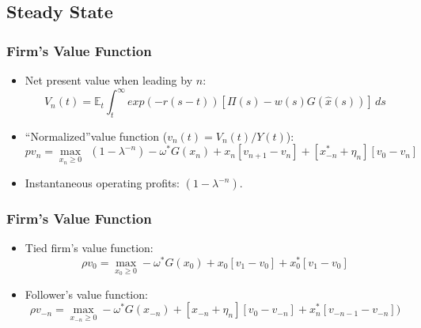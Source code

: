 \documentclass{beamer}
\begin{document}
\subsection{Steady State}
\label{sub:steady_state}
\begin{frame}[t]\frametitle{Firm's Value Function} 
  \begin{itemize}
    \vspace{2mm}
    \item<+-> Net present value when leading by $n$:
      \begin{equation*}
        V_n(t) = \mathbb{E}_t \int_{t}^{\infty} exp(-r(s - t))[\Pi(s) - w(s)G(\hat{x}(s))]\,ds 
      \end{equation*}
	\vspace{2mm}
    \item<+-> ``Normalized''value function ($v_n(t) = V_n(t) / Y(t)$):
      \begin{equation*} \label{eq:rvf_leader}  %
          pv_n = \max_{x_n \geq 0}\ \ (1 - \lambda^{-n}) - \omega^*G(x_n) + x_n[v_{n+1} - v_n] + [x_{-n}^* + \eta_n][v_0 - v_n]
        \end{equation*}
   \item<+-> Instantaneous operating profits: $(1 - \lambda^{-n})$.
  \end{itemize}
\end{frame}

\begin{frame}[t]\frametitle{Firm's Value Function} 
  \begin{itemize}
	  \vspace{10mm}
    \item<+-> Tied firm's value function:
      \begin{equation*} \label{eq:rvf_tied}
        \rho v_0 = \max_{x_0 \geq 0} -\omega^*G(x_{0}) + x_{0}[v_1 - v_0] + x_0^*[v_{1} - v_0]
      \end{equation*}

    \item<+-> Follower's value function:
      \begin{equation*} \label{eq:rvf_follower}
        \rho v_{-n} = \max_{x_{-n} \geq 0} -\omega^*G(x_{-n}) + [x_{-n} + \eta_n][v_0 - v_{-n}] + x_n^*[v_{-n-1} - v_{-n}])
      \end{equation*}
  \end{itemize}
\end{frame}
\end{document}
